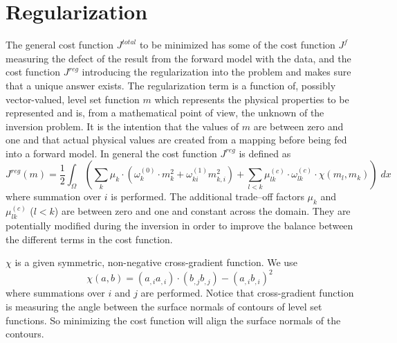 \chapter{Regularization}\label{Chp:ref:regularization}

The general cost function $J^{total}$ to be minimized has some of the cost
function $J^f$ measuring the defect of the result from the
forward model with the data, and the cost function $J^{reg}$ introducing the
regularization into the problem and makes sure that a unique answer exists.
The regularization term is a function of, possibly vector-valued, level set
function $m$ which represents the physical properties to be represented and is,
from a mathematical point of view, the unknown of the inversion problem.
It is the intention that the values of $m$ are between zero and one and that
actual physical values are created from a mapping before being fed into a
forward model. In general the cost function $J^{reg}$ is defined as 
\begin{equation}\label{EQU:REG:1}
J^{reg}(m) = \frac{1}{2} \int_{\Omega} \left(
 \sum_{k} \mu_k \cdot ( \omega^{(0)}_k \cdot m_k^2 + \omega^{(1)}_{ki}m_{k,i}^2 ) 
+  \sum_{l<k} \mu^{(c)}_{lk} \cdot \omega^{(c)}_{lk}  \cdot  \chi(m_l,m_k) \right) \; dx 
\end{equation} 
where summation over $i$ is performed. The additional trade--off factors 
$\mu_k$ and $\mu^{(c)}_{lk}$ ($l<k$) are between zero and one and constant across the 
domain. They are potentially modified during the inversion in order to improve the balance between the different terms 
in the cost function.

$\chi$ is a given symmetric, non-negative cross-gradient function. We use
\begin{equation}\label{EQU:REG:4}
 \chi(a,b) =  ( a_{,i} a_{,i}) \cdot ( b_{,j} b_{,j}) -   ( a_{,i} b_{,i})^2 
\end{equation} 
where summations over $i$ and $j$  are performed. Notice that cross-gradient function
is measuring the angle between the surface normals of contours of level set functions. So 
minimizing the cost function will align the surface normals of the contours.

